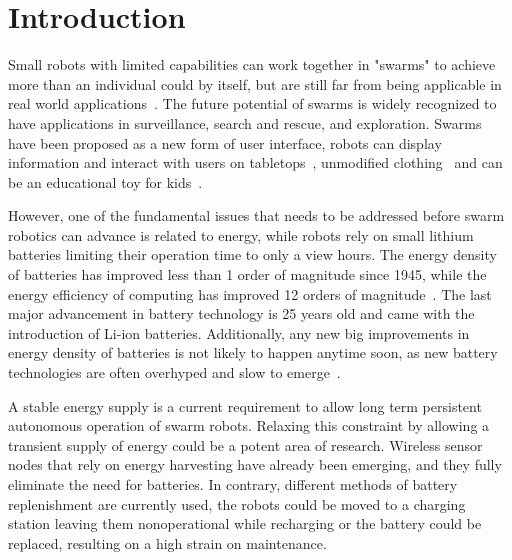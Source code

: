 \chapter{Introduction}
\label{chp:introduction}



Small robots with limited capabilities can work together in "swarms" to achieve more than an individual could by itself, but are still far from being applicable in real world applications~\cite{barca_sekercioglu_2013}.
The future potential of swarms is widely recognized to have applications in surveillance, search and rescue, and exploration.
Swarms have been proposed as a new form of user interface, robots can display information and interact with users on tabletops~\cite{legoc_uist_2016}, unmodified clothing~\cite{dementyev_uist_2016} and can be an educational toy for kids~\cite{sony_toio_2017}.
\hfill \break


However, one of the fundamental issues that needs to be addressed before swarm robotics can advance is related to energy, while robots rely on small lithium batteries limiting their operation time to only a view hours. 
The energy density of batteries has improved less than 1 order of magnitude since 1945, while the energy efficiency of computing has improved 12 orders of magnitude~\cite{patel_pvc_2017}.
The last major advancement in battery technology is 25 years old and came with the introduction of Li-ion batteries.
Additionally, any new big improvements in energy density of batteries is not likely to happen anytime soon, as new battery technologies are often overhyped and slow to emerge~\cite{zachary_spec_2016}.
\hfill \break



A stable energy supply is a current requirement to allow long term persistent autonomous operation of swarm robots.
Relaxing this constraint by allowing a transient supply of energy could be a potent area of research.
Wireless sensor nodes that rely on energy harvesting have already been emerging, and they fully eliminate the need for batteries.
In contrary, different methods of battery replenishment are currently used, the robots could be moved to a charging station leaving them nonoperational while recharging or the battery could be replaced, resulting on a high strain on maintenance.

